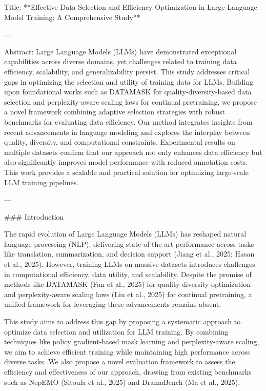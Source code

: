 Title: **Effective Data Selection and Efficiency Optimization in Large Language Model Training: A Comprehensive Study**

---

Abstract:  
Large Language Models (LLMs) have demonstrated exceptional capabilities across diverse domains, yet challenges related to training data efficiency, scalability, and generalizability persist. This study addresses critical gaps in optimizing the selection and utility of training data for LLMs. Building upon foundational works such as DATAMASK for quality-diversity-based data selection and perplexity-aware scaling laws for continual pretraining, we propose a novel framework combining adaptive selection strategies with robust benchmarks for evaluating data efficiency. Our method integrates insights from recent advancements in language modeling and explores the interplay between quality, diversity, and computational constraints. Experimental results on multiple datasets confirm that our approach not only enhances data efficiency but also significantly improves model performance with reduced annotation costs. This work provides a scalable and practical solution for optimizing large-scale LLM training pipelines.

---

### Introduction  

The rapid evolution of Large Language Models (LLMs) has reshaped natural language processing (NLP), delivering state-of-the-art performance across tasks like translation, summarization, and decision support (Jiang et al., 2025; Hasan et al., 2025). However, training LLMs on massive datasets introduces challenges in computational efficiency, data utility, and scalability. Despite the promise of methods like DATAMASK (Fan et al., 2025) for quality-diversity optimization and perplexity-aware scaling laws (Liu et al., 2025) for continual pretraining, a unified framework for leveraging these advancements remains absent.  

This study aims to address this gap by proposing a systematic approach to optimize data selection and utilization for LLM training. By combining techniques like policy gradient-based mask learning and perplexity-aware scaling, we aim to achieve efficient training while maintaining high performance across diverse tasks. We also propose a novel evaluation framework to assess the efficiency and effectiveness of our approach, drawing from existing benchmarks such as NepEMO (Sitoula et al., 2025) and DramaBench (Ma et al., 2025).  

